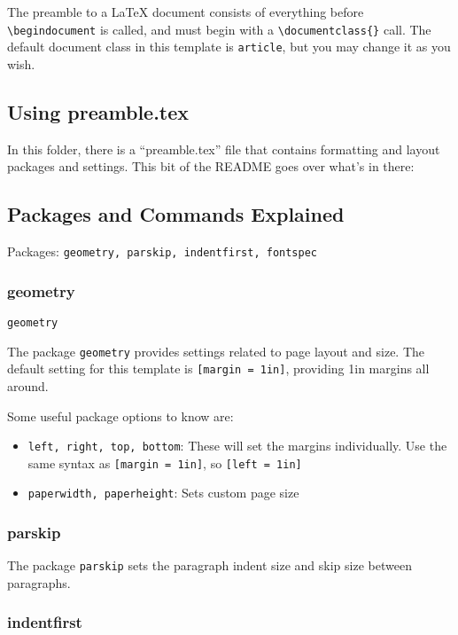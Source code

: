 \documentclass[12pt]{article}
\begin{document}
The preamble to a LaTeX document consists of everything before \texttt{\textbackslash begin{document}} is called, and must begin with a \texttt{\textbackslash documentclass\{\}} call. The default document class in this template is \texttt{article}, but you may change it as you wish.

\subsection{Using preamble.tex}

In this folder, there is a ``preamble.tex'' file that contains formatting and layout packages and settings. This bit of the README goes over what's in there: 


\subsection{Packages and Commands Explained}

Packages: \texttt{geometry, parskip, indentfirst, fontspec}

\subsubsection{geometry} \texttt{geometry}

    The package \texttt{geometry} provides settings related to page layout and size. The default setting for this template is \texttt{[margin = 1in]}, providing 1in margins all around. 

    Some useful package options to know are: 

    \begin{itemize}
        \item \texttt{left, right, top, bottom}: These will set the margins individually. Use the same syntax as \texttt{[margin = 1in]}, so \texttt{[left = 1in]}
        \item \texttt{paperwidth, paperheight}: Sets custom page size
    \end{itemize}

\subsubsection{parskip}

    The package \texttt{parskip} sets the paragraph indent size and skip size between paragraphs. 

\subsubsection{indentfirst}
\end{document}
